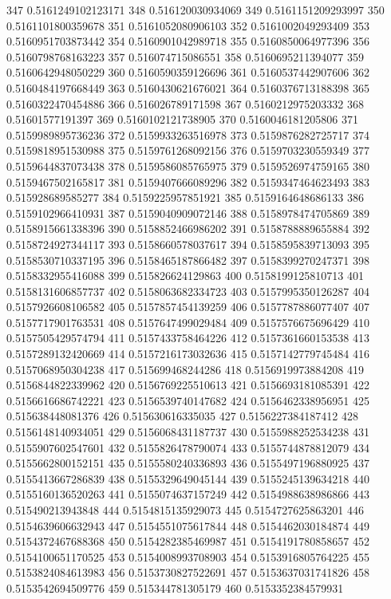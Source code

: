 347 0.5161249102123171
348 0.516120030934069
349 0.5161151209293997
350 0.5161101800359678
351 0.5161052080906103
352 0.5161002049293409
353 0.5160951703873442
354 0.5160901042989718
355 0.5160850064977396
356 0.5160798768163223
357 0.516074715086551
358 0.5160695211394077
359 0.5160642948050229
360 0.5160590359126696
361 0.5160537442907606
362 0.5160484197668449
363 0.5160430621676021
364 0.5160376713188398
365 0.5160322470454886
366 0.516026789171598
367 0.5160212975203332
368 0.51601577191397
369 0.5160102121738905
370 0.5160046181205806
371 0.5159989895736236
372 0.5159933263516978
373 0.5159876282725717
374 0.5159818951530988
375 0.5159761268092156
376 0.5159703230559349
377 0.5159644837073438
378 0.5159586085765975
379 0.5159526974759165
380 0.5159467502165817
381 0.5159407666089296
382 0.5159347464623493
383 0.515928689585277
384 0.5159225957851921
385 0.5159164648686133
386 0.5159102966410931
387 0.5159040909072146
388 0.5158978474705869
389 0.5158915661338396
390 0.5158852466986202
391 0.5158788889655884
392 0.5158724927344117
393 0.5158660578037617
394 0.5158595839713093
395 0.5158530710337195
396 0.5158465187866482
397 0.5158399270247371
398 0.5158332955416088
399 0.515826624129863
400 0.5158199125810713
401 0.5158131606857737
402 0.5158063682334723
403 0.5157995350126287
404 0.5157926608106582
405 0.5157857454139259
406 0.5157787886077407
407 0.5157717901763531
408 0.5157647499029484
409 0.5157576675696429
410 0.5157505429574794
411 0.5157433758464226
412 0.5157361660153538
413 0.5157289132420669
414 0.5157216173032636
415 0.5157142779745484
416 0.5157068950304238
417 0.515699468244286
418 0.5156919973884208
419 0.5156844822339962
420 0.5156769225510613
421 0.5156693181085391
422 0.5156616686742221
423 0.5156539740147682
424 0.5156462338956951
425 0.515638448081376
426 0.515630616335035
427 0.5156227384187412
428 0.5156148140934051
429 0.5156068431187737
430 0.5155988252534238
431 0.5155907602547601
432 0.5155826478790074
433 0.5155744878812079
434 0.5155662800152151
435 0.5155580240336893
436 0.5155497196880925
437 0.5155413667286839
438 0.5155329649045144
439 0.5155245139634218
440 0.5155160136520263
441 0.5155074637157249
442 0.5154988638986866
443 0.515490213943848
444 0.5154815135929073
445 0.5154727625863201
446 0.5154639606632943
447 0.5154551075617844
448 0.5154462030184874
449 0.5154372467688368
450 0.5154282385469987
451 0.5154191780858657
452 0.5154100651170525
453 0.5154008993708903
454 0.5153916805764225
455 0.5153824084613983
456 0.5153730827522691
457 0.5153637031741826
458 0.5153542694509776
459 0.515344781305179
460 0.5153352384579931
